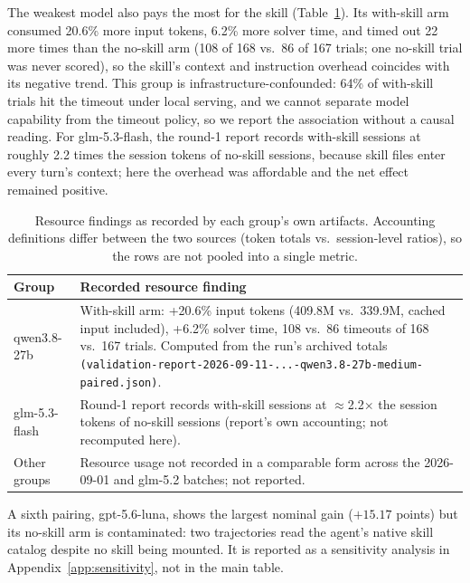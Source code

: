 \documentclass[11pt]{article}
\begin{document}
The weakest model also pays the most for the skill (Table~\ref{tab:resources}).
Its with-skill arm consumed 20.6\% more input tokens, 6.2\% more solver time, and timed out 22 more times than the no-skill arm (108 of 168 vs.\ 86 of 167 trials; one no-skill trial was never scored), so the skill's context and instruction overhead coincides with its negative trend.
This group is infrastructure-confounded: 64\% of with-skill trials hit the timeout under local serving, and we cannot separate model capability from the timeout policy, so we report the association without a causal reading.
For glm-5.3-flash, the round-1 report records with-skill sessions at roughly 2.2 times the session tokens of no-skill sessions, because skill files enter every turn's context; here the overhead was affordable and the net effect remained positive.

\begin{table}[t]
\centering
\small
\begin{tabular}{>{\raggedright\arraybackslash}p{}>{\raggedright\arraybackslash}p{}}
\hline
Group & Recorded resource finding\\
\hline
qwen3.8-27b & With-skill arm: +20.6\% input tokens (409.8M vs.\ 339.9M, cached input included), +6.2\% solver time, 108 vs.\ 86 timeouts of 168 vs.\ 167 trials. Computed from the run's archived totals \texttt{(validation-report-2026-09-11-...-qwen3.8-27b-medium-paired.json)}.\\
glm-5.3-flash & Round-1 report records with-skill sessions at $\approx$2.2$\times$ the session tokens of no-skill sessions (report's own accounting; not recomputed here).\\
Other groups & Resource usage not recorded in a comparable form across the 2026-09-01 and glm-5.2 batches; not reported.\\
\hline
\end{tabular}
\caption{Resource findings as recorded by each group's own artifacts. Accounting definitions differ between the two sources (token totals vs.\ session-level ratios), so the rows are not pooled into a single metric.}
\label{tab:resources}
\end{table}

A sixth pairing, gpt-5.6-luna, shows the largest nominal gain ($+15.17$ points) but its no-skill arm is contaminated: two trajectories read the agent's native skill catalog despite no skill being mounted.
It is reported as a sensitivity analysis in Appendix~\ref{app:sensitivity}, not in the main table.
\end{document}
